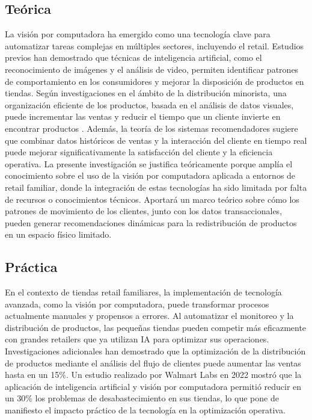 \subsection{Teórica}
La visión por computadora ha emergido como una tecnología clave para automatizar tareas complejas en múltiples sectores, incluyendo el retail. Estudios previos han demostrado que técnicas de inteligencia artificial, como el reconocimiento de imágenes y el análisis de video, permiten identificar patrones de comportamiento en los consumidores y mejorar la disposición de productos en tiendas. Según investigaciones en el ámbito de la distribución minorista, una organización eficiente de los productos, basada en el análisis de datos visuales, puede incrementar las ventas y reducir el tiempo que un cliente invierte en encontrar productos . Además, la teoría de los sistemas recomendadores sugiere que combinar datos históricos de ventas y la interacción del cliente en tiempo real puede mejorar significativamente la satisfacción del cliente y la eficiencia operativa.
La presente investigación se justifica teóricamente porque amplía el conocimiento sobre el uso de la visión por computadora aplicada a entornos de retail familiar, donde la integración de estas tecnologías ha sido limitada por falta de recursos o conocimientos técnicos. Aportará un marco teórico sobre cómo los patrones de movimiento de los clientes, junto con los datos transaccionales, pueden generar recomendaciones dinámicas para la redistribución de productos en un espacio físico limitado.

\subsection{Práctica}
En el contexto de tiendas retail familiares, la implementación de tecnología avanzada, como la visión por computadora, puede transformar procesos actualmente manuales y propensos a errores. Al automatizar el monitoreo y la distribución de productos, las pequeñas tiendas pueden competir más eficazmente con grandes retailers que ya utilizan IA para optimizar sus operaciones. Investigaciones adicionales han demostrado que la optimización de la distribución de productos mediante el análisis del flujo de clientes puede aumentar las ventas hasta en un 15\%. Un estudio realizado por Walmart Labs en 2022 mostró que la aplicación de inteligencia artificial y visión por computadora permitió reducir en un 30\% los problemas de desabastecimiento en sus tiendas, lo que pone de manifiesto el impacto práctico de la tecnología en la optimización operativa. 


